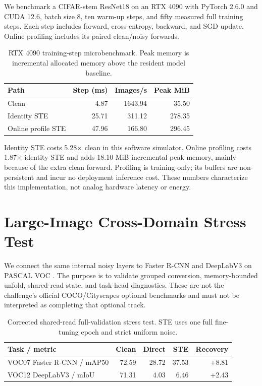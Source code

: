 \documentclass[10pt,twocolumn,letterpaper]{article}
\begin{document}
We benchmark a CIFAR-stem ResNet18 on an RTX 4090 with PyTorch 2.6.0 and CUDA
12.6, batch size 8, ten warm-up steps, and fifty measured full training steps.
Each step includes forward, cross-entropy, backward, and SGD update.  Online
profiling includes its paired clean/noisy forwards.

\begin{table}[t]
\centering
\caption{RTX 4090 training-step microbenchmark.  Peak memory is incremental
allocated memory above the resident model baseline.}
\label{tab:efficiency}
\scriptsize
\setlength{\tabcolsep}{3.6pt}
\begin{tabular}{lrrr}
\toprule
Path & Step (ms) & Images/s & Peak MiB \\
\midrule
Clean & 4.87 & 1643.94 & 35.50 \\
Identity STE & 25.71 & 311.12 & 278.35 \\
Online profile STE & 47.96 & 166.80 & 296.45 \\
\bottomrule
\end{tabular}
\end{table}

Identity STE costs 5.28$\times$ clean in this software simulator.  Online
profiling costs 1.87$\times$ identity STE and adds 18.10 MiB incremental peak
memory, mainly because of the extra clean forward.  Profiling is training-only;
its buffers are non-persistent and incur no deployment inference cost.  These
numbers characterize this implementation, not analog hardware latency or
energy.

\section{Large-Image Cross-Domain Stress Test}
\label{sec:optional}

We connect the same internal noisy layers to Faster R-CNN
\citep{ren2015fasterrcnn} and DeepLabV3 \citep{chen2017deeplab} on PASCAL VOC
\citep{everingham2010voc}.  The purpose is to validate grouped conversion,
memory-bounded unfold, shared-read state, and task-head diagnostics.  These are
not the challenge's official COCO/Cityscapes optional benchmarks and must not be
interpreted as completing that optional track.

\begin{table}[t]
\centering
\caption{Corrected shared-read full-validation stress test.  STE uses one full
fine-tuning epoch and strict uniform noise.}
\label{tab:optional}
\scriptsize
\setlength{\tabcolsep}{4pt}
\begin{tabular}{lrrrr}
\toprule
Task / metric & Clean & Direct & STE & Recovery \\
\midrule
VOC07 Faster R-CNN / mAP50 & 72.59 & 28.72 & 37.53 & +8.81 \\
VOC12 DeepLabV3 / mIoU & 71.31 & 4.03 & 6.46 & +2.43 \\
\bottomrule
\end{tabular}
\end{table}
\end{document}
